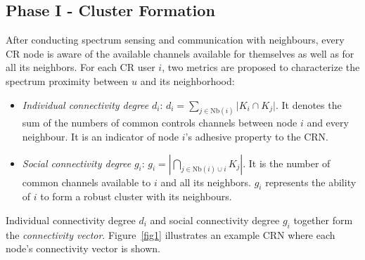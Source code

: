 \documentclass[10pt,journal,compsoc]{IEEEtran}
\theoremstyle{mytheoremstyle}
\theoremstyle{mytheoremstyle}
\theoremstyle{mytheoremstyle}
\begin{document}
\subsection{Phase I - Cluster Formation}
\label{phaseI}
After conducting spectrum sensing and communication with neighbours, every CR node is aware of the available channels available for themselves as well as for all its neighbors.
For each CR user $i$, two metrics are proposed to characterize the spectrum proximity between $u$ and its neighborhood:
\begin{itemize}

\item \textit{Individual connectivity degree} $d_i$: $d_i=\sum_{j\in \text{Nb}(i)}\vert K_i\cap K_j\vert$. It denotes the sum of the numbers of common controls channels between node $i$ and every neighbour.
It is an indicator of node $i$'s adhesive property to the CRN. 

\item \textit{Social connectivity degree} $g_i$: $g_i=|\bigcap_{j\in \text{Nb}(i)\cup i}K_j|$. It is the number of common channels available to $i$ and all its neighbors.
$g_i$ represents the ability of $i$ to form a robust cluster with its neighbours.
\end{itemize}
Individual connectivity degree $d_i$ and social connectivity degree $g_i$ together form the \textit{connectivity vector}.
Figure~\ref{fig1} illustrates an example CRN where each node's connectivity vector is shown.	
\end{document}
